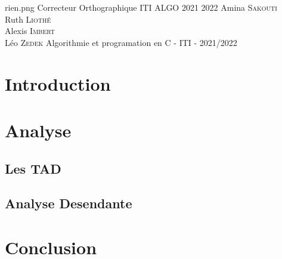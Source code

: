 \documentclass[11pt,a4paper]{article}
\begin{document}
\PageDeGarde	
{rien.png} %
{Correcteur Orthographique} %
{ITI ALGO 2021 2022} %
{Amina \textsc{Sakouti}\\Ruth \textsc{Liothé}\\ Alexis \textsc{Imbert} \\Léo \textsc{Zedek}} %
{Algorithmie et programation en C - ITI - 2021/2022} %



\tableofcontents
\newpage

\section*{Introduction}

\section{Analyse}
\subsection{Les TAD}


\subsection{Analyse Desendante}


\section*{Conclusion}
\end{document}

